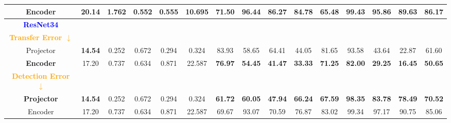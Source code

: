 \begin{table*}[ht]
{\begin{tabular}{cc|cccc|ccccccccc}
    Encoder & 20.14 & 1.762 & 0.552 & 0.555 & 10.695 & 71.50 & 96.44 & 86.27 & 84.78 & 65.48 & 99.43 & 95.86 & 89.63 & 86.17 \\
    
    \hline \hline
    \textcolor{blue}{\textbf{ResNet34}} \\
    \textcolor{orange}{\textbf{Transfer Error $\downarrow$}} \\
    Projector & \textbf{14.54} & 0.252 & 0.672 & 0.294 & 0.324 & 83.93 & 58.65 & 64.41 & 44.05 & 81.65 & 93.58 & 43.64 & 22.87 & 61.60 \\
    
    \rowcolor[gray]{0.9}
    \textbf{Encoder} & 17.20 & 0.737 & 0.634 & 0.871 & 22.587 & \textbf{76.97} & \textbf{54.45} & \textbf{41.47} & \textbf{33.33} & \textbf{71.25} & \textbf{82.00} & \textbf{29.25} & \textbf{16.45} & \textbf{50.65} \\
    
    \hline
    \textcolor{orange}{\textbf{Detection Error $\downarrow$}} \\
    \rowcolor[gray]{0.9}
    \textbf{Projector} & \textbf{14.54} & 0.252 & 0.672 & 0.294 & 0.324 & \textbf{61.72} & \textbf{60.05} & \textbf{47.94} & \textbf{66.24} & \textbf{67.59} & \textbf{98.35} & \textbf{83.78} & \textbf{78.49} & \textbf{70.52} \\

    Encoder & 17.20 & 0.737 & 0.634 & 0.871 & 22.587 & 69.67 & 93.07 & 70.59 & 76.87 & 83.02 & 99.34 & 97.17 & 90.75 & 85.06 \\
    \bottomrule
    \end{tabular}}
\end{table*}